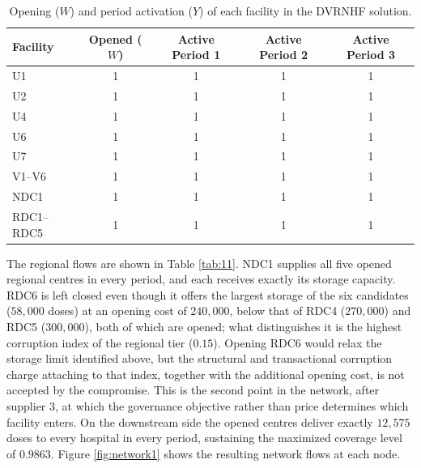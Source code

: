 \documentclass[a4paper]{elsarticle}
\begin{document}
{\begin{table}[htbp]
\centering
\caption{Opening ($W$) and period activation ($Y$) of each facility in the
DVRNHF solution.}
\label{tab:activation}
\begin{tabular}{lcccc}
\toprule
Facility & Opened ($W$) & Active Period 1 & Active Period 2 & Active Period 3 \\
\midrule
U1          & 1 & 1 & 1 & 1 \\
U2          & 1 & 1 & 1 & 1 \\
U4          & 1 & 1 & 1 & 1 \\
U6          & 1 & 1 & 1 & 1 \\
U7          & 1 & 1 & 1 & 1 \\
V1--V6      & 1 & 1 & 1 & 1 \\
NDC1        & 1 & 1 & 1 & 1 \\
RDC1--RDC5  & 1 & 1 & 1 & 1 \\
\bottomrule
\end{tabular}
\end{table}
The regional flows are shown in Table \ref{tab:11}. NDC1 supplies all five opened regional centres in every period, and each receives exactly its storage capacity. RDC6 is left closed even though it offers the largest storage of the six candidates ($58,000$ doses) at an opening cost of $240,000$, below that of RDC4 ($270,000$) and RDC5 ($300,000$), both of which are opened; what distinguishes it is the highest corruption index of the regional tier ($0.15$). Opening RDC6 would relax the storage limit identified above, but the structural and transactional corruption charge attaching to that index, together with the additional opening cost, is not accepted by the compromise. This is the second point in the network, after supplier 3, at which the governance objective rather than price determines which facility enters. On the downstream side the opened centres deliver exactly $12,575$ doses to every hospital in every period, sustaining the maximized coverage level of $0.9863$. Figure \ref{fig:network1} shows the resulting network flows at each node.
}
\end{document}
